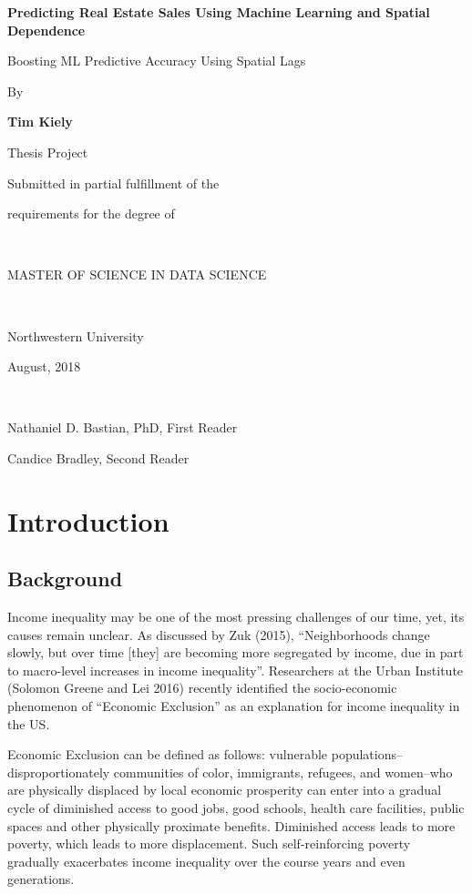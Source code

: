 \documentclass[12pt,]{article}
\title{}
\author{}
\date{}
\begin{document}

\titlepage
\center
\vspace{4 cm} \LARGE
\bf 
Predicting Real Estate Sales Using Machine Learning and Spatial Dependence

\Large
Boosting ML Predictive Accuracy Using Spatial Lags

\rm
\normalsize

By

\textbf{Tim Kiely}

Thesis Project

Submitted in partial fulfillment of the

requirements for the degree of

~

MASTER OF SCIENCE IN DATA SCIENCE

~

Northwestern University

August, 2018

~

Nathaniel D. Bastian, PhD, First Reader

Candice Bradley, Second Reader

\normalsize
\newpage
\tableofcontents
\newpage
{} \flushleft

 \pagestyle{plain}

\section{Introduction}\label{introduction}

\subsection{Background}\label{background}

Income inequality may be one of the most pressing challenges of our
time, yet, its causes remain unclear. As discussed by Zuk (2015),
``Neighborhoods change slowly, but over time {[}they{]} are becoming
more segregated by income, due in part to macro-level increases in
income inequality''. Researchers at the Urban Institute (Solomon Greene
and Lei 2016) recently identified the socio-economic phenomenon of
``Economic Exclusion'' as an explanation for income inequality in the
US.

Economic Exclusion can be defined as follows: vulnerable
populations--disproportionately communities of color, immigrants,
refugees, and women--who are physically displaced by local economic
prosperity can enter into a gradual cycle of diminished access to good
jobs, good schools, health care facilities, public spaces and other
physically proximate benefits. Diminished access leads to more poverty,
which leads to more displacement. Such self-reinforcing poverty
gradually exacerbates income inequality over the course years and even
generations.
\end{document}
